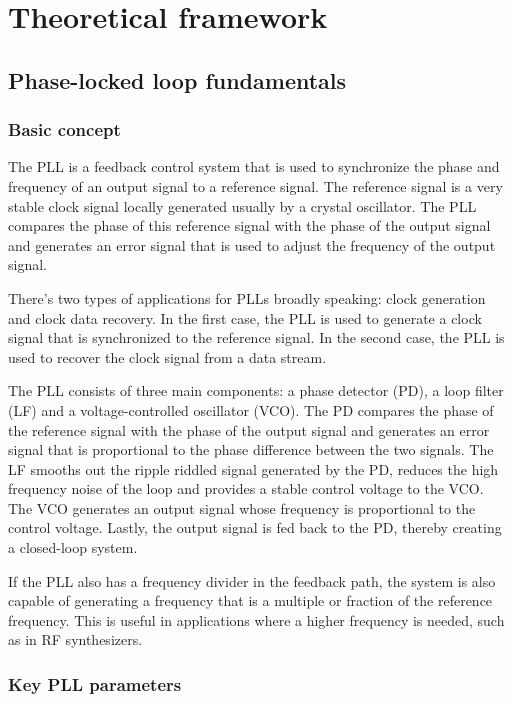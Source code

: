 \chapter{Theoretical framework}

\section{Phase-locked loop fundamentals}
\subsection{Basic concept}
The PLL is a feedback control system that is used to synchronize the phase and frequency of an output signal to a reference signal. The 
reference signal is a very stable clock signal locally generated usually by a crystal oscillator. The PLL compares the phase of this 
reference signal with the phase of the output signal and generates an error signal that is used to adjust the frequency of the output 
signal.

\noindent There's two types of applications for PLLs broadly speaking: clock generation and clock data recovery. In the first case,
the PLL is used to generate a clock signal that is synchronized to the reference signal. In the second case, the PLL is used to recover 
the clock signal from a data stream.

\noindent The PLL consists of three main components: a phase detector (PD), a loop filter (LF) and a voltage-controlled oscillator (VCO). 
The PD compares the phase of the reference signal with the phase of the output signal and generates an error signal that is proportional 
to the phase difference between the two signals. The LF smooths out the ripple riddled signal generated by the PD, reduces the high 
frequency noise of the loop and provides a stable control voltage to the VCO. The VCO generates an output signal whose frequency is 
proportional to the control voltage. Lastly, the output signal is fed back to the PD, thereby creating a closed-loop system.

\noindent If the PLL also has a frequency divider in the feedback path, the system is also capable of generating a frequency that is a
multiple or fraction of the reference frequency. This is useful in applications where a higher frequency is needed, 
such as in RF synthesizers.

\subsection{Key PLL parameters}
